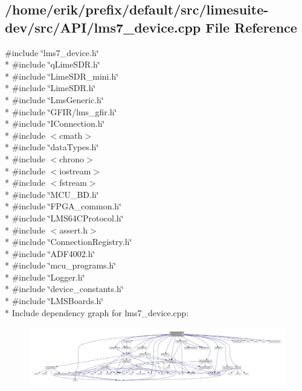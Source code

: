 \subsection{/home/erik/prefix/default/src/limesuite-\/dev/src/\+A\+P\+I/lms7\+\_\+device.cpp File Reference}
\label{lms7__device_8cpp}
{\ttfamily \#include \char`\"{}lms7\+\_\+device.\+h\char`\"{}}\\*
{\ttfamily \#include \char`\"{}q\+Lime\+S\+D\+R.\+h\char`\"{}}\\*
{\ttfamily \#include \char`\"{}Lime\+S\+D\+R\+\_\+mini.\+h\char`\"{}}\\*
{\ttfamily \#include \char`\"{}Lime\+S\+D\+R.\+h\char`\"{}}\\*
{\ttfamily \#include \char`\"{}Lms\+Generic.\+h\char`\"{}}\\*
{\ttfamily \#include \char`\"{}G\+F\+I\+R/lms\+\_\+gfir.\+h\char`\"{}}\\*
{\ttfamily \#include \char`\"{}I\+Connection.\+h\char`\"{}}\\*
{\ttfamily \#include $<$cmath$>$}\\*
{\ttfamily \#include \char`\"{}data\+Types.\+h\char`\"{}}\\*
{\ttfamily \#include $<$chrono$>$}\\*
{\ttfamily \#include $<$iostream$>$}\\*
{\ttfamily \#include $<$fstream$>$}\\*
{\ttfamily \#include \char`\"{}M\+C\+U\+\_\+\+B\+D.\+h\char`\"{}}\\*
{\ttfamily \#include \char`\"{}F\+P\+G\+A\+\_\+common.\+h\char`\"{}}\\*
{\ttfamily \#include \char`\"{}L\+M\+S64\+C\+Protocol.\+h\char`\"{}}\\*
{\ttfamily \#include $<$assert.\+h$>$}\\*
{\ttfamily \#include \char`\"{}Connection\+Registry.\+h\char`\"{}}\\*
{\ttfamily \#include \char`\"{}A\+D\+F4002.\+h\char`\"{}}\\*
{\ttfamily \#include \char`\"{}mcu\+\_\+programs.\+h\char`\"{}}\\*
{\ttfamily \#include \char`\"{}Logger.\+h\char`\"{}}\\*
{\ttfamily \#include \char`\"{}device\+\_\+constants.\+h\char`\"{}}\\*
{\ttfamily \#include \char`\"{}L\+M\+S\+Boards.\+h\char`\"{}}\\*
Include dependency graph for lms7\+\_\+device.\+cpp\+:
\nopagebreak
\begin{figure}[H]
\begin{center}
\leavevmode
\includegraphics[width=350pt]{dc/d89/lms7__device_8cpp__incl}
\end{center}
\end{figure}
